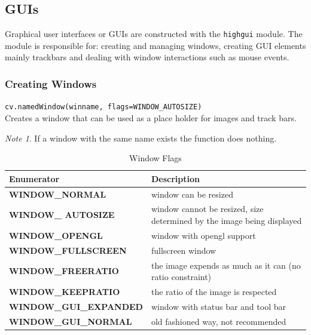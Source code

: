 \documentclass{article}
\theoremstyle{definition}
\theoremstyle{remark}
\newtheorem*{nb}{Note}
\newcommand{\func}[2]{\noindent\lstinline{#1}\\#2}
\begin{document}
\subsection{GUIs}

Graphical user interfaces or GUIs are constructed with the \lstinline{highgui} module. The module is responsible for: creating and managing windows, creating GUI elements mainly trackbars and dealing with window interactions such as mouse events.

\subsubsection{Creating Windows}

\func{cv.namedWindow(winname, flags=WINDOW_AUTOSIZE)}{Creates a window that can be used as a place holder for images and track bars.\\}

\begin{nb}
If a window with the same name exists the function does nothing.
\end{nb}

\begin{table}[h!]
    \centering
    \def\arraystretch{1.1}%
    \begin{tabular}{ p{5cm} p{7cm} } 
	\hline
	Enumerator & Description \\
	\hline
	\textbf{\footnotesize{WINDOW\_NORMAL}} & window can be resized \\

	\textbf{\footnotesize{WINDOW\_ AUTOSIZE}} & window cannot be resized, size determined by the image being displayed \\

	\textbf{\footnotesize{WINDOW\_OPENGL}} & window with opengl support \\

	\textbf{\footnotesize{WINDOW\_FULLSCREEN}} & fullscreen window \\

	\textbf{\footnotesize{WINDOW\_FREERATIO}} & the image expends as much as it can (no ratio constraint) \\

	\textbf{\footnotesize{WINDOW\_KEEPRATIO}} & the ratio of the image is respected \\

	\textbf{\footnotesize{WINDOW\_GUI\_EXPANDED}} & window with status bar and tool bar \\

	\textbf{\footnotesize{WINDOW\_GUI\_NORMAL}} & old fashioned way, not recommended \\
    \hline
    \end{tabular}
    \caption{Window Flags}
    \label{table:win_flgs}
\end{table}
\end{document}
